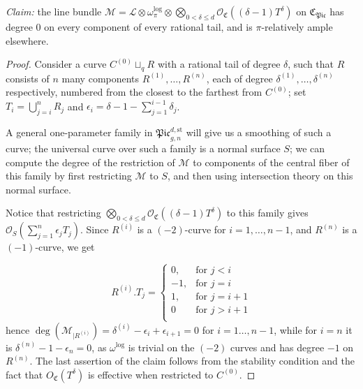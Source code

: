 \begin{center}

\end{center}

\emph{Claim:} the line bundle $\mathcal M=\mathcal L\otimes\omega_{\pi}^{\text{log}}\otimes\bigotimes_{0<\delta\leq d}\mathcal O_{\mathfrak C}((\delta-1) T^\delta)$ on $\mathfrak{C}_{\mathfrak{Pic}}$ has degree 0 on every component of every rational tail, and is $\pi$-relatively ample elsewhere.

\begin{proof}

Consider a curve $C^{(0)}\sqcup_q R$ with a rational tail of degree $\delta$, such that $R$ consists of $n$ many components $R^{(1)
},\ldots,R^{(n)}$, each of degree $\delta^{(1)},\ldots,\delta^{(n)}$ respectively, numbered from the closest to the farthest from $C^{(0)}$; set $T_i=\bigcup_{j=i}^n R_j$ and $\epsilon_i=\delta-1-\sum_{j=1}^{i-1}\delta_j$.

\begin{center}

\end{center}

A general one-parameter family in $\mathfrak{Pic}_{g,n}^{d,\text{st}}$ will give us a smoothing of such a curve; the universal curve over such a family is a normal surface $S$; we can compute the degree of the restriction of $\mathcal M$ to components of the central fiber of this family by first restricting $\mathcal M$ to $S$, and then using intersection theory on this normal surface.

Notice that restricting $\bigotimes_{0<\delta\leq d}\mathcal O_{\mathfrak C}((\delta-1) T^\delta)$ to this family gives $\mathcal O_S(\sum_{j=1}^n\epsilon_jT_j)$. Since $R^{(i)}$ is a $(-2)$-curve for $i=1,\ldots,n-1$, and $R^{(n)}$ is a $(-1)$-curve, we get

\[
  R^{(i)}.T_j =
  \begin{cases}
    0, & \text{for } j<i \\
    -1, & \text{for } j=i \\
    1, & \text{for } j=i+1 \\
    0 & \text{for } j>i+1 \\
  \end{cases}
\]
hence $\deg(\mathcal M_{|R^{(i)}})=\delta^{(i)}-\epsilon_i+\epsilon_{i+1}=0$ for $i=1\ldots,n-1$, while for $i=n$ it is $\delta^{(n)}-1-\epsilon_n=0$, as $\omega^{\text{log}}$ is trivial on the $(-2)$ curves and has degree $-1$ on $R^{(n)}$. The last assertion of the claim follows from the stability condition and the fact that $O_{\mathfrak C}(T^\delta)$ is effective when restricted to $C^{(0)}$.
\end{proof}

